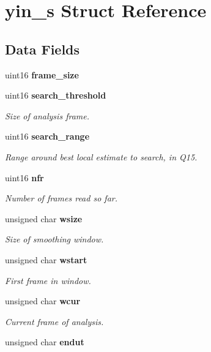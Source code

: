 \section{yin\-\_\-s \-Struct \-Reference}
\label{structyin__s}
\subsection*{\-Data \-Fields}
\begin{DoxyCompactItemize}
\item 
uint16 {\bfseries frame\-\_\-size}\label{structyin__s_a25a7e0400397ab1fcbf82f4d0568722a}

\item 
uint16 {\bf search\-\_\-threshold}
\begin{DoxyCompactList}\small\item\em \-Size of analysis frame. \end{DoxyCompactList}\item 
uint16 {\bf search\-\_\-range}\label{structyin__s_a208dfba1535fdd31962e687d82913dfd}

\begin{DoxyCompactList}\small\item\em \-Range around best local estimate to search, in \-Q15. \end{DoxyCompactList}\item 
uint16 {\bf nfr}
\begin{DoxyCompactList}\small\item\em \-Number of frames read so far. \end{DoxyCompactList}\item 
unsigned char {\bf wsize}
\begin{DoxyCompactList}\small\item\em \-Size of smoothing window. \end{DoxyCompactList}\item 
unsigned char {\bf wstart}
\begin{DoxyCompactList}\small\item\em \-First frame in window. \end{DoxyCompactList}\item 
unsigned char {\bf wcur}
\begin{DoxyCompactList}\small\item\em \-Current frame of analysis. \end{DoxyCompactList}\item 
unsigned char {\bf endut}\label{structyin__s_a61ca0fc8444a1bdde10aca37dc9f0f56}


\end{DoxyCompactItemize}
